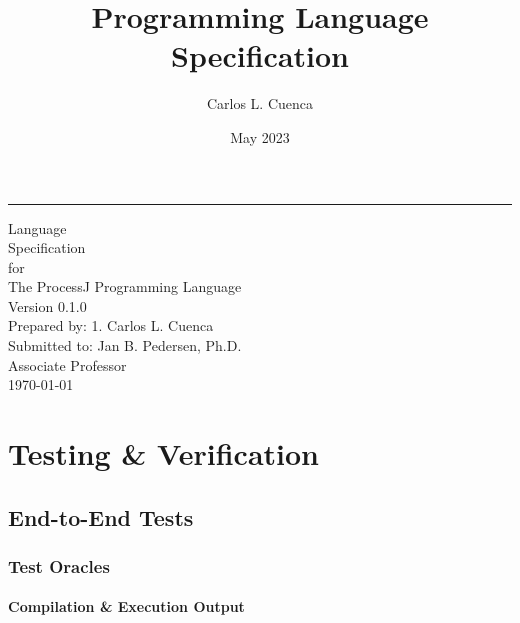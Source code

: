 \documentclass[12pt]{book}
\title{Programming Language Specification}
\author{Carlos L. Cuenca}
\date{May 2023}
\def\version{0.1.0}
\begin{document}

    \begin{flushright}
        \rule{12cm}{4pt}\vskip1cm
        \begin{bfseries}
            \Huge{Language\\ Specification}\\
            \vspace{0.8cm}
            for\\
            \vspace{0.8cm}
            The ProcessJ Programming Language\\
            \vspace{0.8cm}
            \LARGE{Version \version}\\
            \vspace{0.8cm}
            Prepared by: 1. Carlos L. Cuenca\\
            \vspace{0.8cm}
            Submitted to: Jan B. Pedersen, Ph.D. \\Associate Professor\\
            \vspace{0.8cm}
            \today\\
        \end{bfseries}
    \end{flushright}

    \tableofcontents


    \chapter{Testing \& Verification}


    \section{End-to-End Tests}


    \subsection{Test Oracles}

    \subsubsection{Compilation \& Execution Output}
\end{document}
